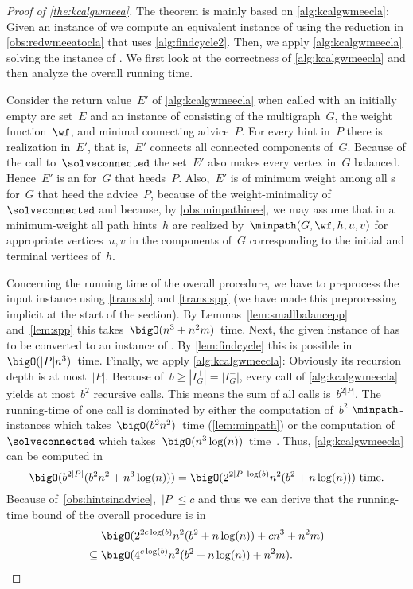 \begin{proof}[Proof of \autoref{the:kcalgwmeea}]
  The theorem is mainly based on \autoref{alg:kcalgwmeecla}: Given an instance of \pWMEECAs{} we compute an equivalent instance of \pWMEECCLAs{} using the reduction in \autoref{obs:redwmeeatocla} that uses \autoref{alg:findcycle2}. Then, we apply \autoref{alg:kcalgwmeecla} solving the instance of \pWMEECLAs{}. We first look at the correctness of \autoref{alg:kcalgwmeecla} and then analyze the overall running time.

  Consider the return value~$E'$ of \autoref{alg:kcalgwmeecla} when called with an initially empty arc set~$E$ and an instance of \pWMEECLAs{} consisting of the multigraph~$G$, the weight function~$\wf$, and minimal connecting advice~$P$. For every hint in~$P$ there is realization in~$E'$, that is,~$E'$ connects all connected components of~$G$. Because of the call to~$\solveconnected$ the set~$E'$ also makes every vertex in~$G$ balanced. Hence~$E'$ is an \EE{} for~$G$ that heeds~$P$. Also,~$E'$ is of minimum weight among all \EE s for~$G$ that heed the advice~$P$, because of the weight-minimality of~$\solveconnected$ and because, by \autoref{obs:minpathinee}, we may assume that in a minimum-weight \EE{} all path hints~$h$ are realized by~$\minpath(G, \wf, h, u, v)$ for appropriate vertices~$u, v$ in the components of~$G$ corresponding to the initial and terminal vertices of~$h$.

Concerning the running time of the overall procedure, we have to preprocess the input instance using \autoref{trans:sb} and \autoref{trans:spp} (we have made this preprocessing implicit at the start of the section). By Lemmas~\ref{lem:smallbalancepp} and~\ref{lem:spp} this takes~$\bigO(n^3 + n^2m)$~time. Next, the given instance of \pWMEECAs{} has to be converted to an instance of \pWMEECCLAs{}. By \autoref{lem:findcycle} this is possible in~$\bigO(|P|n^3)$~time. Finally, we apply \autoref{alg:kcalgwmeecla}: Obviously its recursion depth is at most~$|P|$. Because of~$b \geq |I^+_G| = |I^-_G|$, every call of \autoref{alg:kcalgwmeecla} yields at most~$b^2$ recursive calls. This means the sum of all calls is~$b^{2|P|}$. The running-time of one call is dominated by either the computation of~$b^2$ $\minpath$-instances which takes~$\bigO(b^2n^2)$~time (\autoref{lem:minpath}) or the computation of $\solveconnected$ which takes~$\bigO(n^3\log(n))$~time~\cite{DMNW10}. Thus, \autoref{alg:kcalgwmeecla} can be computed in \[\bigO(b^{2|P|}(b^2n^2 + n^3\log(n))) = \bigO(2^{2|P|\log(b)}n^2(b^2 + n\log(n))) \text{ time.}\]
Because of~\autoref{obs:hintsinadvice},~$|P| \leq c$ and thus we can derive that the running-time bound of the overall procedure is in~
\begin{align*}
          & \bigO(2^{2c\log(b)}n^2(b^2+ n\log(n)) + cn^3 + n^2m) \\
\subseteq {} & \bigO(4^{c\log(b)}n^2(b^2+ n\log(n)) + n^2m)\text{.} \tag*{\qedhere}
\end{align*}
\end{proof}

